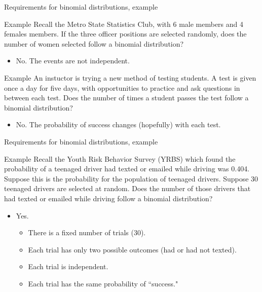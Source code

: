 \documentclass[xcolor=table]{beamer}
\begin{document}
\begin{frame}{Requirements for binomial distributions, example}
\begin{exampleblock}{Example}
Recall the Metro State Statistics Club, with 6 male members and 4 females members. If the three officer positions are selected randomly, does the number of women selected follow a binomial distribution?
\begin{itemize}
\pause\item No. The events are not independent.
\end{itemize}
\end{exampleblock}
\pause
\begin{exampleblock}{Example}
An instuctor is trying a new method of testing students. A test is given once a day for five days, with opportunities to practice and ask questions in between each test. Does the number of times a student passes the test follow a binomial distribution?
\begin{itemize}
\pause\item No. The probability of success changes (hopefully) with each test.
\end{itemize}
\end{exampleblock}

\end{frame}

\begin{frame}{Requirements for binomial distributions, example}
\begin{exampleblock}{Example}
Recall the Youth Risk Behavior Survey (YRBS) which found the probability of a teenaged driver had texted or emailed while driving was 0.404. Suppose this is the probability for the population of teenaged drivers. Suppose 30 teenaged drivers are selected at random. Does the number of those drivers that had texted or emailed while driving follow a binomial distribution?
\begin{itemize}
\pause\item Yes. 
\begin{itemize}
\item There is a fixed number of trials (30).
\item Each trial has only two possible outcomes (had or had not texted).
\item Each trial is independent.
\item Each trial has the same probability of ``success."
\end{itemize}
\end{itemize}
\end{exampleblock}

\end{frame}
\end{document}
